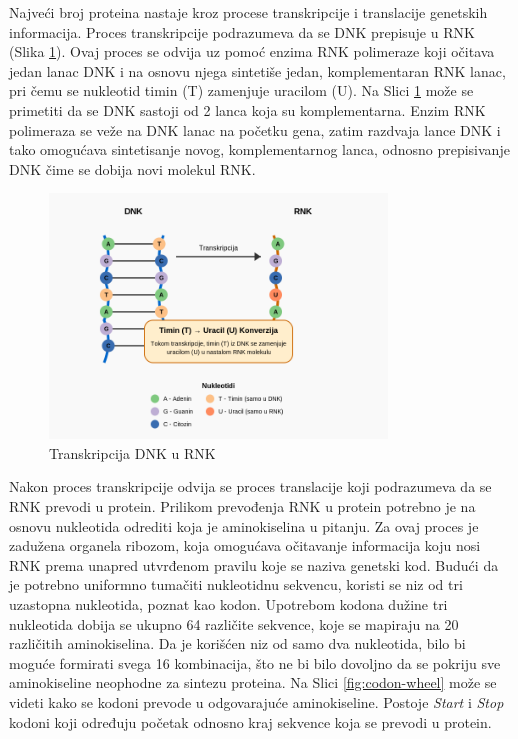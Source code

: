 \documentclass[12pt,oneside]{memoir}
\begin{document}
Najveći broj proteina nastaje kroz procese transkripcije i translacije genetskih informacija. 
Proces transkripcije podrazumeva da se DNK prepisuje u RNK (Slika \ref{fig:transkripcija}). Ovaj proces se odvija uz pomoć enzima RNK polimeraze koji očitava jedan lanac DNK i na osnovu njega sintetiše jedan, komplementaran RNK lanac, pri čemu se nukleotid timin (T) zamenjuje uracilom (U). Na Slici \ref{fig:transkripcija} može se primetiti da se DNK sastoji od 2 lanca koja su komplementarna. Enzim RNK polimeraza se veže na DNK lanac na početku gena, zatim razdvaja lance DNK i tako omogućava sintetisanje novog, komplementarnog lanca, odnosno prepisivanje DNK čime se dobija novi molekul RNK.

\begin{figure}[h]
  \centering
  \includegraphics[width=0.8\textwidth]{images/dna_rna_transcription_diagram.png}
  \caption{Transkripcija DNK u RNK}
  \label{fig:transkripcija}
\end{figure}

Nakon proces transkripcije odvija se proces translacije koji podrazumeva da se RNK prevodi u protein. Prilikom prevođenja RNK u protein potrebno je na osnovu nukleotida odrediti koja je aminokiselina u pitanju. Za ovaj proces je zadužena organela ribozom, koja omogućava očitavanje informacija koju nosi RNK prema unapred utvrđenom pravilu koje se naziva genetski kod. Budući da je potrebno uniformno tumačiti nukleotidnu sekvencu, koristi se niz od tri uzastopna nukleotida, poznat kao kodon. Upotrebom kodona dužine tri nukleotida dobija se ukupno 64 različite sekvence, koje se mapiraju na 20 različitih aminokiselina. Da je korišćen niz od samo dva nukleotida, bilo bi moguće formirati svega 16 kombinacija, što ne bi bilo dovoljno da se pokriju sve aminokiseline neophodne za sintezu proteina. Na Slici \ref{fig:codon-wheel} može se videti kako se kodoni prevode u odgovarajuće aminokiseline. Postoje \emph{Start} i \emph{Stop} kodoni koji određuju početak odnosno kraj sekvence koja se prevodi u protein.
\end{document}
